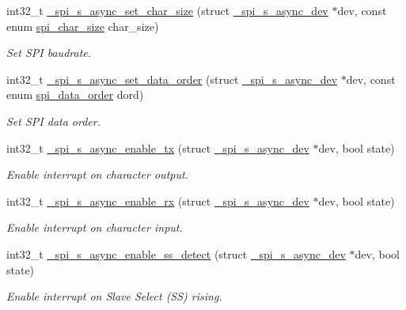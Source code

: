 \begin{DoxyCompactItemize}
int32\+\_\+t \hyperlink{group__hpl__spi_gaa004cfed65f6200145d623ade4c23bb7}{\+\_\+spi\+\_\+s\+\_\+async\+\_\+set\+\_\+char\+\_\+size} (struct \hyperlink{group__hpl__spi_ga7ac9e8d408bc498841e8e461ad8656aa}{\+\_\+spi\+\_\+s\+\_\+async\+\_\+dev} $\ast$dev, const enum \hyperlink{group__hpl__spi_ga4a3ef460c2cea333834811806f32d60a}{spi\+\_\+char\+\_\+size} char\+\_\+size)
\begin{DoxyCompactList}\small\item\em Set S\+PI baudrate. \end{DoxyCompactList}\item 
int32\+\_\+t \hyperlink{group__hpl__spi_ga3e8f1969cbefb53284f84f7dbcc71565}{\+\_\+spi\+\_\+s\+\_\+async\+\_\+set\+\_\+data\+\_\+order} (struct \hyperlink{group__hpl__spi_ga7ac9e8d408bc498841e8e461ad8656aa}{\+\_\+spi\+\_\+s\+\_\+async\+\_\+dev} $\ast$dev, const enum \hyperlink{group__hpl__spi_gabaa69dbc0601cb5b1e2681400598a4b2}{spi\+\_\+data\+\_\+order} dord)
\begin{DoxyCompactList}\small\item\em Set S\+PI data order. \end{DoxyCompactList}\item 
int32\+\_\+t \hyperlink{group__hpl__spi_ga95cc445c703d422f1043bdbae0ffd7b3}{\+\_\+spi\+\_\+s\+\_\+async\+\_\+enable\+\_\+tx} (struct \hyperlink{group__hpl__spi_ga7ac9e8d408bc498841e8e461ad8656aa}{\+\_\+spi\+\_\+s\+\_\+async\+\_\+dev} $\ast$dev, bool state)
\begin{DoxyCompactList}\small\item\em Enable interrupt on character output. \end{DoxyCompactList}\item 
int32\+\_\+t \hyperlink{group__hpl__spi_ga6434080b193c1e9546e90db3d01dab81}{\+\_\+spi\+\_\+s\+\_\+async\+\_\+enable\+\_\+rx} (struct \hyperlink{group__hpl__spi_ga7ac9e8d408bc498841e8e461ad8656aa}{\+\_\+spi\+\_\+s\+\_\+async\+\_\+dev} $\ast$dev, bool state)
\begin{DoxyCompactList}\small\item\em Enable interrupt on character input. \end{DoxyCompactList}\item 
int32\+\_\+t \hyperlink{group__hpl__spi_ga850ea6c15d3c93959f618b363f445182}{\+\_\+spi\+\_\+s\+\_\+async\+\_\+enable\+\_\+ss\+\_\+detect} (struct \hyperlink{group__hpl__spi_ga7ac9e8d408bc498841e8e461ad8656aa}{\+\_\+spi\+\_\+s\+\_\+async\+\_\+dev} $\ast$dev, bool state)
\begin{DoxyCompactList}\small\item\em Enable interrupt on Slave Select (SS) rising. \end{DoxyCompactList}\item 

\end{DoxyCompactItemize}
